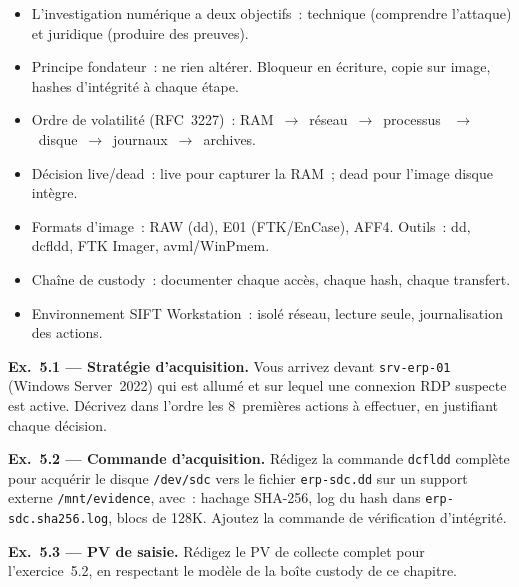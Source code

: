 \begin{boxresume}
\begin{itemize}
  \item L'investigation numérique a deux objectifs~: technique
        (comprendre l'attaque) et juridique (produire des preuves).
  \item Principe fondateur~: ne rien altérer. Bloqueur en écriture,
        copie sur image, hashes d'intégrité à chaque étape.
  \item Ordre de volatilité (RFC~3227)~: RAM~$\to$~réseau~$\to$~processus
        ~$\to$~disque~$\to$~journaux~$\to$~archives.
  \item Décision live/dead~: live pour capturer la RAM~; dead pour
        l'image disque intègre.
  \item Formats d'image~: RAW (dd), E01 (FTK/EnCase), AFF4.
        Outils~: dd, dcfldd, FTK Imager, avml/WinPmem.
  \item Chaîne de custody~: documenter chaque accès, chaque hash,
        chaque transfert.
  \item Environnement SIFT Workstation~: isolé réseau, lecture seule,
        journalisation des actions.
\end{itemize}
\end{boxresume}

\begin{boxexo}
\textbf{Ex.~5.1 — Stratégie d'acquisition.}
Vous arrivez devant \texttt{srv-erp-01} (Windows Server~2022) qui
est allumé et sur lequel une connexion RDP suspecte est active.
Décrivez dans l'ordre les 8~premières actions à effectuer, en
justifiant chaque décision.

\medskip\textbf{Ex.~5.2 — Commande d'acquisition.}
Rédigez la commande \texttt{dcfldd} complète pour acquérir le disque
\texttt{/dev/sdc} vers le fichier \texttt{erp-sdc.dd} sur un support
externe \texttt{/mnt/evidence}, avec~: hachage SHA-256, log du hash
dans \texttt{erp-sdc.sha256.log}, blocs de 128K.
Ajoutez la commande de vérification d'intégrité.

\medskip\textbf{Ex.~5.3 — PV de saisie.}
Rédigez le PV de collecte complet pour l'exercice~5.2,
en respectant le modèle de la boîte custody de ce chapitre.
\end{boxexo}
